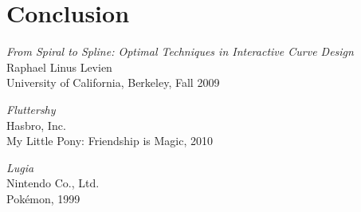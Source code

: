 \documentclass[a4paper]{article}
\begin{document}

	\section{Conclusion}


	\begin{thebibliography}{}

			\emph{From Spiral to Spline: Optimal Techniques in Interactive Curve Design}\\
			Raphael Linus Levien\\
			University of California, Berkeley, Fall 2009

			\emph{Fluttershy}\\
			Hasbro, Inc.\\
			My Little Pony: Friendship is Magic, 2010

			\emph{Lugia}\\
			Nintendo Co., Ltd.\\
			Pokémon, 1999

	\end{thebibliography}
\end{document}
